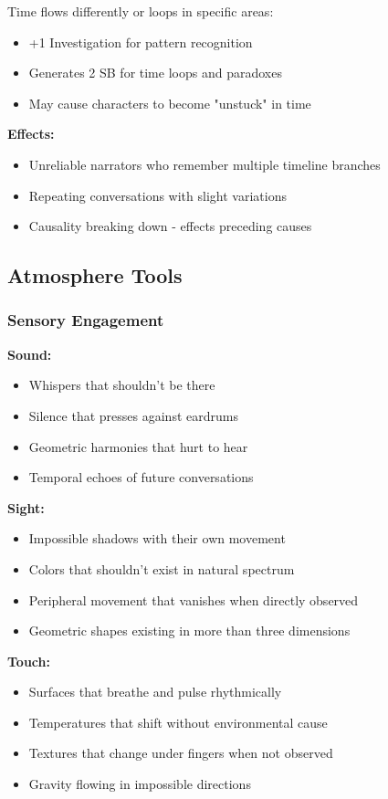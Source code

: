 \documentclass[11pt]{article}
\begin{document}
Time flows differently or loops in specific areas:
\begin{itemize}
\item +1 Investigation for pattern recognition
\item Generates 2 SB for time loops and paradoxes
\item May cause characters to become "unstuck" in time
\end{itemize}

\textbf{Effects:}
\begin{itemize}
\item Unreliable narrators who remember multiple timeline branches
\item Repeating conversations with slight variations
\item Causality breaking down - effects preceding causes
\end{itemize}

\subsection{Atmosphere Tools}

\subsubsection{Sensory Engagement}

\textbf{Sound:}
\begin{itemize}
\item Whispers that shouldn't be there
\item Silence that presses against eardrums
\item Geometric harmonies that hurt to hear
\item Temporal echoes of future conversations
\end{itemize}

\textbf{Sight:}
\begin{itemize}
\item Impossible shadows with their own movement
\item Colors that shouldn't exist in natural spectrum
\item Peripheral movement that vanishes when directly observed
\item Geometric shapes existing in more than three dimensions
\end{itemize}

\textbf{Touch:}
\begin{itemize}
\item Surfaces that breathe and pulse rhythmically
\item Temperatures that shift without environmental cause
\item Textures that change under fingers when not observed
\item Gravity flowing in impossible directions
\end{itemize}
\end{document}
